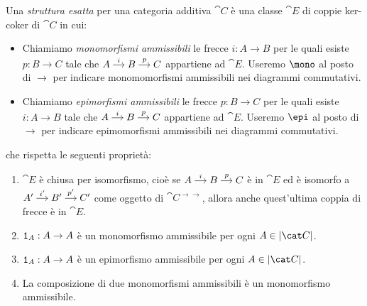 \begin{definition}\label{definition:CategorieEsatte}
  Una {\em struttura esatta} per una categoria additiva \(\cat C\) è una
  classe \(\cat E\) di coppie ker-coker di \(\cat C\) in cui:
  \begin{itemize}[leftmargin=*]
  \item Chiamiamo {\em monomorfismi ammissibili} le frecce
    \(i : A \to B\) per le quali esiste \(p : B \to C\) tale che
    \(\begin{tikzcd}[column sep=small, cramped] A \ar["{i}", r] & B
      \ar["{p}", r] & C \end{tikzcd}\) appartiene ad \(\cat E\). Useremo
    \(\mono\) al posto di \(\to\) per indicare monomomorfismi
    ammissibili nei diagrammi commutativi.
  \item Chiamiamo {\em epimorfismi ammissibili} le frecce
    \(p : B \to C\) per le quali esiste \(i : A \to B\) tale che
    \(\begin{tikzcd}[column sep=small, cramped] A \ar["{i}", r] & B
      \ar["{p}", r] & C \end{tikzcd}\) appartiene ad \(\cat E\). Useremo
    \(\epi\) al posto di \(\to\) per indicare epimomorfismi ammissibili
    nei diagrammi commutativi.
  \end{itemize}
  che rispetta le seguenti proprietà:
  \begin{enumerate}[leftmargin=*, label=(E\arabic*),
    ref=(E\arabic*)]
  \item \(\cat E\) è chiusa per isomorfismo, cioè se
    \(\begin{tikzcd}[column sep=small, cramped] A \ar["{i}", r] & B
      \ar["{p}", r] & C \end{tikzcd}\) è in \(\cat E\) ed è isomorfo a
    \(\begin{tikzcd}[column sep=small, cramped] A' \ar["{i'}", r] & B'
      \ar["{p'}", r] & C' \end{tikzcd}\) come oggetto di
    \(\cat C^{\to\to}\), allora anche quest'ultima coppia di frecce è in
    \(\cat E\).
  \item \label{item:EO} \(\mathtt 1_A : A \to A\) è un monomorfismo
    ammissibile per ogni \(A \in \obj{\cat C}\).
  \item \label{item:EOop} \(\mathtt 1_A : A \to A\) è un epimorfismo
    ammissibile per ogni \(A \in \obj{\cat C}\).
  \item \label{item:E1} La composizione di due monomorfismi ammissibili
    è un monomorfismo ammissibile.

\end{enumerate}
\end{definition}
